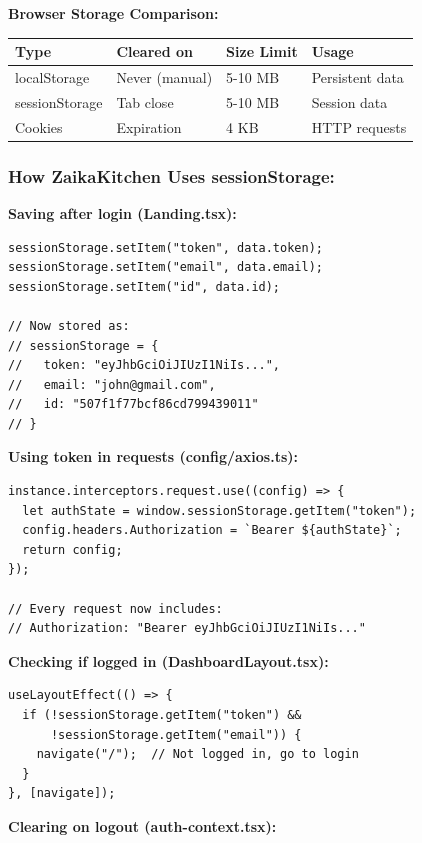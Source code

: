\documentclass[12pt]{article}
\begin{document}
\textbf{Browser Storage Comparison:}

\begin{center}
\begin{tabular}{|l|l|l|l|}
\hline
\textbf{Type} & \textbf{Cleared on} & \textbf{Size Limit} & \textbf{Usage} \\
\hline
localStorage & Never (manual) & 5-10 MB & Persistent data \\
sessionStorage & Tab close & 5-10 MB & Session data \\
Cookies & Expiration & 4 KB & HTTP requests \\
\hline
\end{tabular}
\end{center}

\subsubsection*{How ZaikaKitchen Uses sessionStorage:}

\textbf{Saving after login (Landing.tsx):}

\begin{lstlisting}
sessionStorage.setItem("token", data.token);
sessionStorage.setItem("email", data.email);
sessionStorage.setItem("id", data.id);

// Now stored as:
// sessionStorage = {
//   token: "eyJhbGciOiJIUzI1NiIs...",
//   email: "john@gmail.com",
//   id: "507f1f77bcf86cd799439011"
// }
\end{lstlisting}

\textbf{Using token in requests (config/axios.ts):}

\begin{lstlisting}
instance.interceptors.request.use((config) => {
  let authState = window.sessionStorage.getItem("token");
  config.headers.Authorization = `Bearer ${authState}`;
  return config;
});

// Every request now includes:
// Authorization: "Bearer eyJhbGciOiJIUzI1NiIs..."
\end{lstlisting}

\textbf{Checking if logged in (DashboardLayout.tsx):}

\begin{lstlisting}
useLayoutEffect(() => {
  if (!sessionStorage.getItem("token") && 
      !sessionStorage.getItem("email")) {
    navigate("/");  // Not logged in, go to login
  }
}, [navigate]);
\end{lstlisting}

\textbf{Clearing on logout (auth-context.tsx):}
\end{document}
